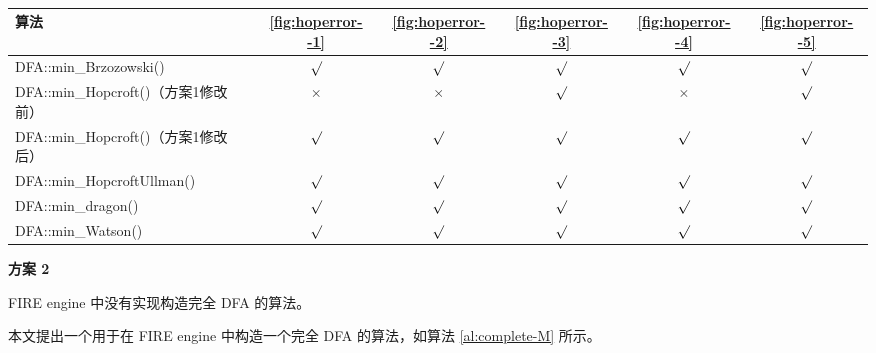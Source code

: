 \begin{table}[!htbp]
    \caption{  }
    \label{tab:KeepMinResultofAll-fix1}
    \centering
    \setlength{\tabcolsep}{6pt}%
    \renewcommand{\arraystretch}{1.2}%
    \begin{tabular}{l| ccccc }  %
        \toprule %
        算法 & \ref{fig:hoperror--1} & \ref{fig:hoperror--2} & \ref{fig:hoperror--3} & \ref{fig:hoperror--4} &  \ref{fig:hoperror--5}  \\
        \midrule
        DFA::min\_Brzozowski()        & $\surd$ & $\surd$ & $\surd$ & $\surd$     & $\surd$        \\
        DFA::min\_Hopcroft()（方案1修改前） & $\times$    & $\times$ & $\surd$ & $\times$        & $\surd$       \\
        DFA::min\_Hopcroft()（方案1修改后） & $\surd$& $\surd$& $\surd$ & $\surd$    & $\surd$       \\
        DFA::min\_HopcroftUllman()    & $\surd$ & $\surd$ & $\surd$ & $\surd$     & $\surd$       \\
        DFA::min\_dragon()            & $\surd$ & $\surd$ & $\surd$ & $\surd$     & $\surd$       \\
        DFA::min\_Watson()            & $\surd$ & $\surd$ & $\surd$ & $\surd$     & $\surd$       \\
        \bottomrule%
    \end{tabular}
\end{table}

{\bfseries 方案 2}

FIRE engine 中没有实现构造完全 DFA 的算法。

本文提出一个用于在 FIRE engine 中构造一个完全 DFA 的算法，如算法 \ref{al:complete-M} 所示。

